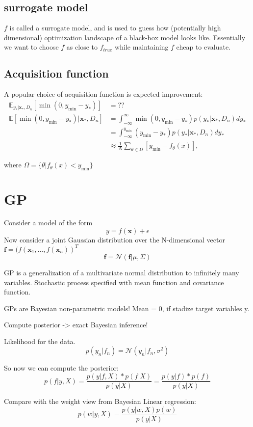 \subsection{surrogate model}
$f$ is called a surrogate model, and is used to guess how (potentially high dimensional) optimization landscape of a black-box model looks like. Essentially we want to choose $f$ as close to $f_{true}$ while maintaining $f$ cheap to evaluate. 

\subsection{Acquisition function}
A popular choice of acquisition function is expected improvement:
\begin{align*}
    \mathbb{E}_{y_*|\textbf{x}_*,D_n}[\min(0,y_{\min}-y_*)] &= ??\\
    \mathbb{E}[\min(0,y_{\min}-y_*)|\textbf{x}_*,D_n] &= \int_{-\infty}^\infty \min(0,y_{\min}-y_*) p(y_*|\textbf{x}_*,D_n) dy_*\\
    &= \int_{-\infty}^{y_{\min}} (y_{\min}-y_*) p(y_*|\textbf{x}_*,D_n) dy_*\\
    &\approx \frac{1}{N} \sum_{\theta \in \Omega } [y_{\min}-f_\theta(x)],
\end{align*}

where $\Omega = \{\theta|f_{\theta}(x)< y_{\min}\}$


\section{GP}
Consider a model of the form $$y = f(\textbf{x})+\epsilon$$
Now consider a joint Gaussian distribution over the N-dimensional vector $\textbf{f} = (f(\textbf{x}_1,\dots, f(\textbf{x}_n))^T$
$$\textbf{f} = \mathcal{N}(\textbf{f}|\mu,\Sigma)$$

GP is a generalization of a multivariate normal distribution to infinitely many variables. 
Stochastic process specified with mean function and covariance function.  

GPs are Bayesian non-parametric models!
Mean = 0, if stadize target variables y. 

Compute posterior -> exact Bayesian inference!

Likelihood for the data. 
$$p(y_n|f_n) = \mathcal{N}(y_n|f_n,\sigma^2)$$

So now we can compute the posterior:
$$p(f|y,X)=\frac{p(y|f,X)*p(f|X)}{p(y|X)}=\frac{p(y|f)*p(f)}{p(y|X)}$$ 

Compare with the weight view from Bayesian Linear regression:
$$p(w|y,X)=\frac{p(y|w,X)p(w)}{p(y|X)}$$

